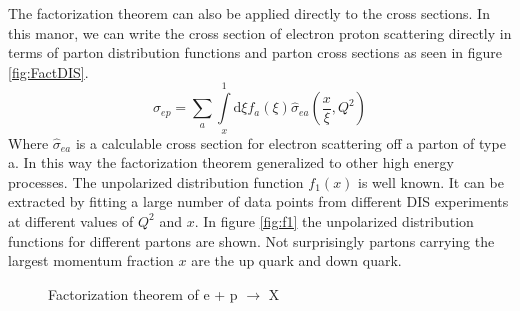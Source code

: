 \documentclass[abstract = on,listof=totoc, bibliography=totoc]{scrreprt}
\begin{document}
The factorization theorem can also be applied directly to the cross sections. In this manor, we can write the cross section of electron proton scattering directly in terms of parton distribution functions and parton cross sections as seen in figure \ref{fig:FactDIS}.
\begin{equation}
\sigma_{ep} = \sum\limits_a \int\limits_x^1 \text{d}\xi f_a(\xi) \hat{\sigma}_{ea}\left(\frac{x}{\xi},Q^2\right)
\end{equation}
Where $\hat{\sigma}_{ea}$ is a calculable cross section for electron scattering off a parton of type a. In this way the factorization theorem generalized to other high energy processes.\cite{factorization}
The unpolarized distribution function $f_1(x)$ is well known. It can be extracted by fitting a large number of data points from different DIS experiments at different values of $Q^2$ and $x$.\cite{unpolDisFuncPic} In figure \ref{fig:f1} the unpolarized distribution functions for different partons are shown. Not surprisingly partons carrying the largest momentum fraction $x$ are the up quark and down quark. 
\begin{figure}[!tbp]
  \centering
  \hfill
  \caption{Factorization theorem of e + p $\rightarrow$ X}
\end{figure}
\end{document}
